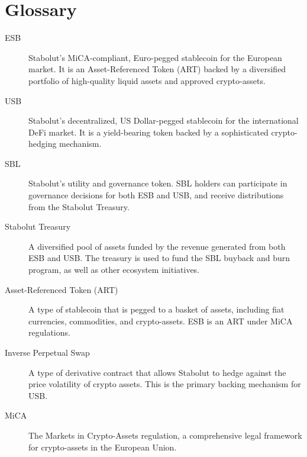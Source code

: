 \documentclass[11pt, a4paper]{article} %
\begin{document}
\section*{Glossary}
\begin{description}
\item[ESB] Stabolut's MiCA-compliant, Euro-pegged stablecoin for the European market. It is an Asset-Referenced Token (ART) backed by a diversified portfolio of high-quality liquid assets and approved crypto-assets.

\item[USB] Stabolut's decentralized, US Dollar-pegged stablecoin for the international DeFi market. It is a yield-bearing token backed by a sophisticated crypto-hedging mechanism.

\item[SBL] Stabolut's utility and governance token. SBL holders can participate in governance decisions for both ESB and USB, and receive distributions from the Stabolut Treasury.

\item[Stabolut Treasury] A diversified pool of assets funded by the revenue generated from both ESB and USB. The treasury is used to fund the SBL buyback and burn program, as well as other ecosystem initiatives.

\item[Asset-Referenced Token (ART)] A type of stablecoin that is pegged to a basket of assets, including fiat currencies, commodities, and crypto-assets. ESB is an ART under MiCA regulations.

\item[Inverse Perpetual Swap] A type of derivative contract that allows Stabolut to hedge against the price volatility of crypto assets. This is the primary backing mechanism for USB.

\item[MiCA] The Markets in Crypto-Assets regulation, a comprehensive legal framework for crypto-assets in the European Union.
\end{description}

 
\end{document}
